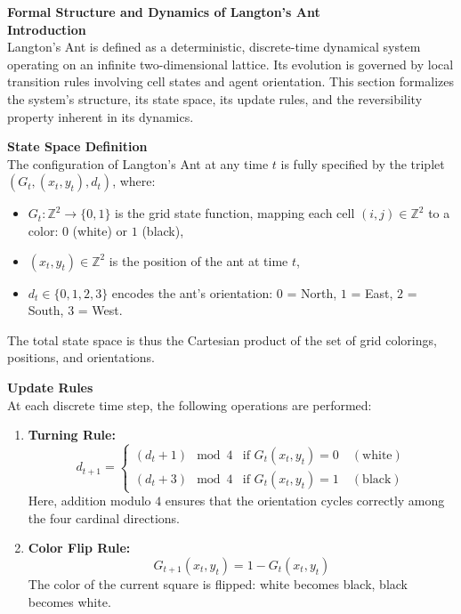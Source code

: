 \begin{technical}
{\Large\textbf{Formal Structure and Dynamics of Langton's Ant}}\\[0.7em]

\textbf{Introduction}\\[0.5em]
Langton's Ant is defined as a deterministic, discrete-time dynamical system operating on an infinite two-dimensional lattice. Its evolution is governed by local transition rules involving cell states and agent orientation. This section formalizes the system's structure, its state space, its update rules, and the reversibility property inherent in its dynamics.

\textbf{State Space Definition}\\[0.5em]
The configuration of Langton's Ant at any time $t$ is fully specified by the triplet $(G_t, (x_t, y_t), d_t)$, where:
\begin{itemize}
\item $G_t : \mathbb{Z}^2 \to \{0,1\}$ is the grid state function, mapping each cell $(i,j) \in \mathbb{Z}^2$ to a color: $0$ (white) or $1$ (black),
\item $(x_t, y_t) \in \mathbb{Z}^2$ is the position of the ant at time $t$,
\item $d_t \in \{0,1,2,3\}$ encodes the ant’s orientation: $0$ = North, $1$ = East, $2$ = South, $3$ = West.
\end{itemize}

The total state space is thus the Cartesian product of the set of grid colorings, positions, and orientations.

\textbf{Update Rules}\\[0.5em]
At each discrete time step, the following operations are performed:
\begin{enumerate}
\item \textbf{Turning Rule:}  
  \[
  d_{t+1} =
  \begin{cases}
    (d_t + 1) \mod 4 & \text{if } G_t(x_t, y_t) = 0 \quad (\text{white})\\
    (d_t + 3) \mod 4 & \text{if } G_t(x_t, y_t) = 1 \quad (\text{black})
  \end{cases}
  \]
Here, addition modulo $4$ ensures that the orientation cycles correctly among the four cardinal directions.

\item \textbf{Color Flip Rule:}  
  \[
  G_{t+1}(x_t, y_t) = 1 - G_t(x_t, y_t)
  \]
The color of the current square is flipped: white becomes black, black becomes white.


\end{enumerate}
\end{technical}

